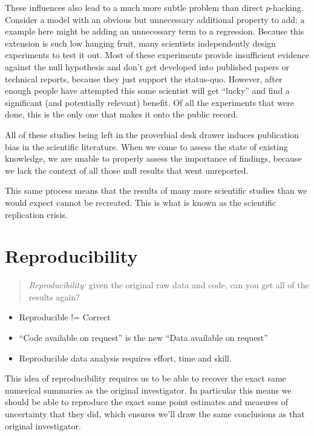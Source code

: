 \documentclass[
  letterpaper,
  DIV=11,
  numbers=noendperiod]{scrreprt}
\begin{document}
These influences also lead to a much more subtle problem than direct
\(p\)-hacking. Consider a model with an obvious but unnecessary
additional property to add: a example here might be adding an
unnecessary term to a regression. Because this extension is such low
hanging fruit, many scientists independently design experiments to test
it out. Most of these experiments provide insufficient evidence against
the null hypothesis and don't get developed into published papers or
technical reports, because they just support the status-quo. However,
after enough people have attempted this some scientist will get
``lucky'' and find a significant (and potentially relevant) benefit. Of
all the experiments that were done, this is the only one that makes it
onto the public record.

All of these studies being left in the proverbial desk drawer induces
publication bias in the scientific literature. When we come to assess
the state of existing knowledge, we are unable to properly assess the
importance of findings, because we lack the context of all those null
results that went unreported.

This same process means that the results of many more scientific studies
than we would expect cannot be recreated. This is what is known as the
scientific replication crisis.

\section{Reproducibility}\label{reproducibility-1}

\begin{quote}
\emph{Reproducibility:} given the original raw data and code, can you
get all of the results again?
\end{quote}

\begin{itemize}
\item
  Reproducible != Correct
\item
  ``Code available on request'' is the new ``Data available on request''
\item
  Reproducible data analysis requires effort, time and skill.
\end{itemize}

This idea of reproducibility requires us to be able to recover the exact
same numerical summaries as the original investigator. In particular
this means we should be able to reproduce the exact same point estimates
and measures of uncertainty that they did, which ensures we'll draw the
same conclusions as that original investigator.
\end{document}
